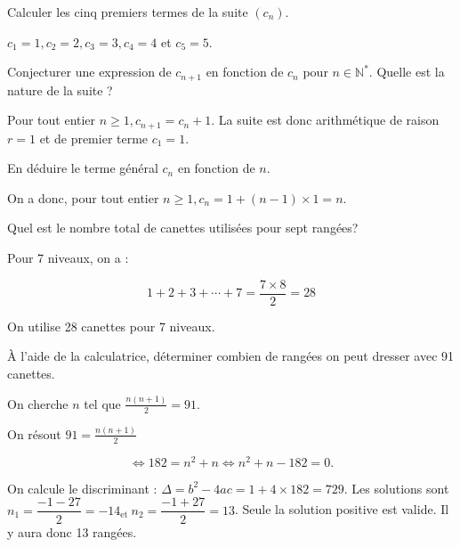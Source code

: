 \documentclass[11pt,a4paper]{article}  %
\begin{document}
\begin{enumMet}
	\item Calculer les cinq premiers termes de la suite $\left(c_n\right)$.
	\begin{corrBox}
			$c_1=1, c_2=2, c_3=3, c_4=4$ et $c_5=5$.	
	\end{corrBox}
	\item Conjecturer une expression de $c_{n+1}$ en fonction de $c_n$ pour $n \in \mathbb{N}^*$. Quelle est la nature de la suite ?
	\begin{corrBox}
		Pour tout entier $n \geqslant 1, c_{n+1}=c_n+1$. La suite est donc arithmétique de raison $r=1$ et de premier terme $c_1=1$.
	\end{corrBox}
	\item En déduire le terme général $c_n$ en fonction de $n$.
	\begin{corrBox}
		On a donc, pour tout entier $n \geqslant 1, c_n=1+(n-1) \times 1=n$.		
	\end{corrBox}
	\item Quel est le nombre total de canettes utilisées pour sept rangées?
	\begin{corrBox}
		Pour 7 niveaux, on a :
		
		$$
		1+2+3+\cdots+7=\frac{7 \times 8}{2}=28
		$$
		
		
		On utilise 28 canettes pour 7 niveaux.		
	\end{corrBox}
	\item À l'aide de la calculatrice, déterminer combien de rangées on peut dresser avec 91 canettes.
	\begin{corrBox}
		On cherche $n$ tel que $\frac{n(n+1)}{2}=91$.
		
		On résout $91=\frac{n(n+1)}{2}$
		
		$$
		\Longleftrightarrow 182=n^2+n \Longleftrightarrow n^2+n-182=0 .
		$$
		
		
		On calcule le discriminant : $\Delta=b^2-4 a c=1+4 \times 182=729$.
		Les solutions sont $n_1=\dfrac{-1-27}{2}=-14{ }_{\text {et }} n_2=\dfrac{-1+27}{2}=13$.
		Seule la solution positive est valide. Il y aura donc 13 rangées.		
	\end{corrBox}
\end{enumMet}


\end{document}
